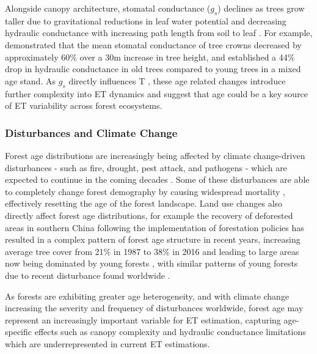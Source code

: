 \documentclass[paper=a4,fontsize=12pt]{scrartcl}
\begin{document}
\par Alongside canopy architecture, stomatal conductance ($g_s$) declines as trees grow taller due to gravitational reductions in leaf water potential and decreasing hydraulic conductance with increasing path length from soil to leaf \parencite{ryan1997hydraulic}. For example, \textcite{schafer2000effect} demonstrated that the mean stomatal conductance of tree crowns decreased by approximately 60\% over a 30m increase in tree height, and \textcite{hubbard1999evidence} established a 44\% drop in hydraulic conductance in old trees compared to young trees in a mixed age stand. As $g_s$ directly influences T \parencite{monteith1965evaporation}, these age related changes introduce further complexity into ET dynamics and suggest that age could be a key source of ET variability across forest ecosystems.


\subsubsection{Disturbances and Climate Change}
Forest age distributions are increasingly being affected by climate change-driven disturbances - such as fire, drought, pest attack, and pathogens - which are expected to continue in the coming decades \parencite{solomon2009irreversible, seidl2017forest, altman2024global}. Some of these disturbances are able to completely change forest demography by causing widespread mortality \parencite{dale2001climate}, effectively resetting the age of the forest landscape. Land use changes also directly affect forest age distributions, for example the recovery of deforested areas in southern China following the implementation of forestation policies has resulted in a complex pattern of forest age structure in recent years, increasing average tree cover from 21\% in 1987 to 38\% in 2016 and leading to large areas now being dominated by young forests \parencite{tong2020forest, leng2024forest}, with similar patterns of young forests due to recent disturbance found worldwide \parencite{besnard2021mapping}.
\par As forests are exhibiting greater age heterogeneity, and with climate change increasing the severity and frequency of disturbances worldwide, forest age may represent an increasingly important variable for ET estimation, capturing age-specific effects such as canopy complexity and hydraulic conductance limitations which are underrepresented in current ET estimations. 

\end{document}
